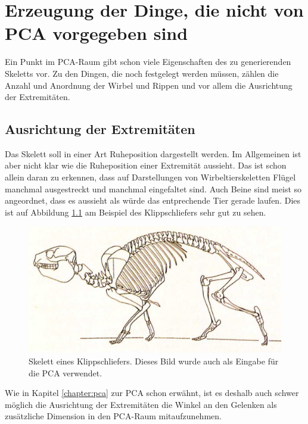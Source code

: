 \chapter{Erzeugung der Dinge, die nicht von PCA vorgegeben sind}

Ein Punkt im PCA-Raum gibt schon viele Eigenschaften des zu generierenden Skeletts vor. Zu den Dingen, die noch festgelegt werden müssen, zählen \zb die Anzahl und Anordnung der Wirbel und Rippen und vor allem die Ausrichtung der Extremitäten.

\section{Ausrichtung der Extremitäten}
\label{section:extremity_generation}

Das Skelett soll in einer Art Ruheposition dargestellt werden. Im Allgemeinen ist aber nicht klar wie die Ruheposition einer Extremität aussieht. Das ist schon allein daran zu erkennen, dass auf Darstellungen von Wirbeltierskeletten Flügel manchmal ausgestreckt und manchmal eingefaltet sind. Auch Beine sind meist so angeordnet, dass es aussieht als würde das entprechende Tier gerade laufen. Dies ist auf Abbildung \ref{klippschliefer} am Beispiel des Klippschliefers sehr gut zu sehen.

 \begin{figure}
  \centering
  \includegraphics{../PCA/Skelettbilder/Klippschliefer.jpg}
  \caption{Skelett eines Klippschliefers. Dieses Bild wurde auch als Eingabe für die PCA verwendet.}
  \label{klippschliefer}
 \end{figure}

Wie in Kapitel \ref{chapter:pca} zur PCA schon erwähnt, ist es deshalb auch schwer möglich die Ausrichtung der Extremitäten \bzw die Winkel an den Gelenken als zusätzliche Dimension in den PCA-Raum mitaufzunehmen.

